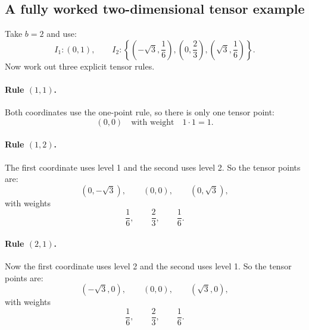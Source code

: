 \documentclass[11pt]{article}
\numberwithin{equation}{section}
\begin{document}
\subsection{A fully worked two-dimensional tensor example}

Take \(b=2\) and use:
\begin{equation}
  I_1:(0,1),
  \qquad
  I_2:\left\{\left(-\sqrt3,\frac16\right),\left(0,\frac23\right),
  \left(\sqrt3,\frac16\right)\right\}.
  \label{eq:p36-level1-level2-rules}
\end{equation}
Now work out three explicit tensor rules.

\paragraph{Rule \texorpdfstring{\((1,1)\)}{(1,1)}.}
Both coordinates use the one-point rule, so there is only one tensor point:
\begin{equation}
  (0,0)
  \quad\text{with weight}\quad 1\cdot 1 = 1.
  \label{eq:p36-rule-11}
\end{equation}

\paragraph{Rule \texorpdfstring{\((1,2)\)}{(1,2)}.}
The first coordinate uses level 1 and the second uses level 2.  So the tensor
points are:
\begin{equation}
  (0,-\sqrt3),\qquad (0,0),\qquad (0,\sqrt3),
  \label{eq:p36-rule-12-points}
\end{equation}
with weights
\begin{equation}
  \frac16,\qquad \frac23,\qquad \frac16.
  \label{eq:p36-rule-12-weights}
\end{equation}

\paragraph{Rule \texorpdfstring{\((2,1)\)}{(2,1)}.}
Now the first coordinate uses level 2 and the second uses level 1.  So the
tensor points are:
\begin{equation}
  (-\sqrt3,0),\qquad (0,0),\qquad (\sqrt3,0),
  \label{eq:p36-rule-21-points}
\end{equation}
with weights
\begin{equation}
  \frac16,\qquad \frac23,\qquad \frac16.
  \label{eq:p36-rule-21-weights}
\end{equation}
\end{document}
